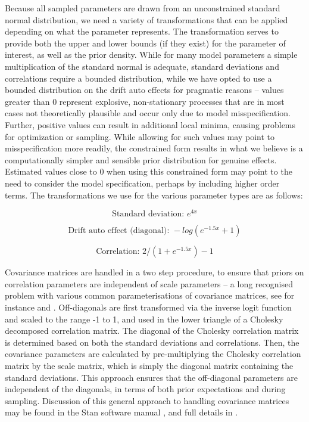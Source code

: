 \documentclass[nojss]{jss}\usepackage[]{graphicx}\usepackage[]{color}
\begin{document}
Because all sampled parameters are drawn from an unconstrained standard normal distribution, we need a variety of transformations that can be applied depending on what the parameter represents. The transformation serves to provide both the upper and lower bounds (if they exist) for the parameter of interest, as well as the prior density. While for many model parameters a simple multiplication of the standard normal is adequate, standard deviations and correlations require a bounded distribution, while we have opted to use a bounded distribution on the drift auto effects for pragmatic reasons -- values greater than 0 represent explosive, non-stationary processes that are in most cases not theoretically plausible and occur only due to model misspecification. Further, positive values can result in additional local minima, causing problems for optimization or sampling. While allowing for such values may point to misspecification more readily, the constrained form results in what we believe is a computationally simpler and sensible prior distribution for genuine effects. Estimated values close to 0 when using this constrained form may point to the need to consider the model specification, perhaps by including higher order terms. The transformations we use for the various parameter types are as follows:

\begin{equation}
\text{Standard deviation: } e^{4x} 
\end{equation}

\begin{equation}
 \text{Drift auto effect (diagonal): } -log(e^{-1.5x}+1)
\end{equation}

\begin{equation}
 \text{Correlation: } 2/(1+e^{-1.5x})-1
\end{equation}

Covariance matrices are handled in a two step procedure, to ensure that priors on correlation parameters are independent of scale parameters -- a long recognised problem with various common parameterisations of covariance matrices, see for instance \citet{huang2013Simple} and \citet{gelman2006Prior}. Off-diagonals are first transformed via the inverse logit function and scaled to the range -1 to 1, and used in the lower triangle of a Cholesky decomposed correlation matrix. The diagonal of the Cholesky correlation matrix is determined based on both the standard deviations and correlations. Then, the covariance parameters are calculated by pre-multiplying the Cholesky correlation matrix by the scale matrix, which is simply the diagonal matrix containing the standard deviations. This approach ensures that the off-diagonal parameters are independent of the diagonals, in terms of both prior expectations and during sampling. Discussion of this general approach to handling covariance matrices may be found in the Stan software manual \citep{standevelopmentteam2016stan}, and full details in \cite{lewandowski2009generating}. 
\end{document}
